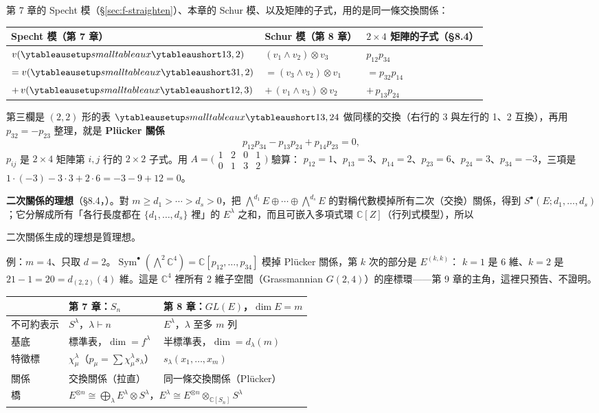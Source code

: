 第 7 章的 Specht 模（\S\ref{sec:f-straighten}）、本章的 Schur 模、以及矩陣的子式，用的是同一條交換關係：
\begin{center}
\begin{tabular}{@{}lll@{}}
\toprule
Specht 模（第 7 章） & Schur 模（第 8 章） & $2\times4$ 矩陣的子式（\S8.4）\\
\midrule
$v(\yts{13,2})$ & $(v_1\wedge v_2)\otimes v_3$ & $p_{12}p_{34}$\\
$=v(\yts{31,2})$ & $=(v_3\wedge v_2)\otimes v_1$ & $=p_{32}p_{14}$\\
$+\,v(\yts{12,3})$ & $+\,(v_1\wedge v_3)\otimes v_2$ & $+\,p_{13}p_{24}$\\
\bottomrule
\end{tabular}
\end{center}
第三欄是 $(2,2)$ 形的表 $\yts{13,24}$ 做同樣的交換（右行的 3 與左行的 1、2 互換），再用 $p_{32}=-p_{23}$ 整理，就是 \textbf{Plücker 關係}
\[
p_{12}p_{34}-p_{13}p_{24}+p_{14}p_{23}=0 ,
\]
$p_{ij}$ 是 $2\times4$ 矩陣第 $i,j$ 行的 $2\times2$ 子式。用 $A=\bigl(\begin{smallmatrix}1&2&0&1\\0&1&3&2\end{smallmatrix}\bigr)$ 驗算：
$p_{12}=1$、$p_{13}=3$、$p_{14}=2$、$p_{23}=6$、$p_{24}=3$、$p_{34}=-3$，三項是 $1\cdot(-3)-3\cdot3+2\cdot6=-3-9+12=0$。

\textbf{二次關係的理想}（\S8.4，）。對 $m\ge d_1>\cdots>d_s>0$，把 $\bigwedge^{d_1}E\oplus\cdots\oplus\bigwedge^{d_s}E$ 的對稱代數模掉所有二次（交換）關係，得到
$S^\bullet(E;d_1,\ldots,d_s)$；它分解成所有「各行長度都在 $\{d_1,\ldots,d_s\}$ 裡」的 $E^\lambda$ 之和，而且可嵌入多項式環 $\mathbb C[Z]$（行列式模型），所以
\begin{thmbox}[命題 2 \fulref{p.126}]
二次關係生成的理想是質理想。
\end{thmbox}
例：$m=4$、只取 $d=2$。$\operatorname{Sym}^\bullet(\bigwedge^2\mathbb C^4)=\mathbb C[p_{12},\ldots,p_{34}]$ 模掉 Plücker 關係，第 $k$ 次的部分是 $E^{(k,k)}$：
$k=1$ 是 $6$ 維、$k=2$ 是 $21-1=20=d_{(2,2)}(4)$ 維。這是 $\mathbb C^4$ 裡所有 2 維子空間（Grassmannian $G(2,4)$）的座標環——第 9 章的主角，這裡只預告、不證明。

\begin{keybox}[第 7、8 章對照]
\begin{tabular}{@{}lll@{}}
 & 第 7 章：$S_n$ & 第 8 章：$GL(E)$，$\dim E=m$\\ \midrule
不可約表示 & $S^\lambda$，$\lambda\vdash n$ & $E^\lambda$，$\lambda$ 至多 $m$ 列\\
基底 & 標準表，$\dim=f^\lambda$ & 半標準表，$\dim=d_\lambda(m)$\\
特徵標 & $\chi^\lambda_\mu$（$p_\mu=\sum\chi^\lambda_\mu s_\lambda$） & $s_\lambda(x_1,\ldots,x_m)$\\
關係 & 交換關係（拉直） & 同一條交換關係（Plücker）\\
橋 & \multicolumn{2}{l}{$E^{\otimes n}\cong\bigoplus_\lambda E^\lambda\otimes S^\lambda$，$E^\lambda\cong E^{\otimes n}\otimes_{\mathbb C[S_n]}S^\lambda$}
\end{tabular}
\end{keybox}
